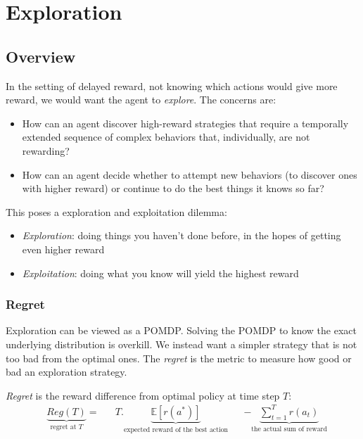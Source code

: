 \chapter{Exploration}

\section{Overview}
In the setting of delayed reward, not knowing which actions would give more reward, we would want the agent to \textit{explore}. The concerns are:
\begin{itemize}
	\item How can an agent discover high-reward strategies that require a temporally extended sequence of complex behaviors that, individually, are not rewarding?
	\item How can an agent decide whether to attempt new behaviors (to discover ones with higher reward) or continue to do the best things it knows so far?
\end{itemize}
This poses a exploration and exploitation dilemma:
\begin{itemize}
	\item \textit{Exploration}: doing things you haven't done before, in the hopes of getting even higher reward
	\item \textit{Exploitation}: doing what you know will yield the highest reward
\end{itemize}

\subsection{Regret}
\label{sec:regret}
Exploration can be viewed as a \ac{POMDP}. Solving the \ac{POMDP} to know the exact underlying distribution is overkill. We instead want a simpler strategy that is not too bad from the optimal ones. The \textit{regret} is the metric to measure how good or bad an exploration strategy.

 \textit{Regret} is the reward difference from optimal policy at time step $T$:
\begin{align*}
	&\underbrace{Reg(T)}_{\textstyle \text{regret at $T$}} = &&T. \underbrace{\mathbb{E}[r(a^*)]}_{\textstyle \text{expected reward of the best action}} && - \underbrace{\sum_{t=1}^T r(a_t)}_{\textstyle \text{the actual sum of reward}}
\end{align*}

